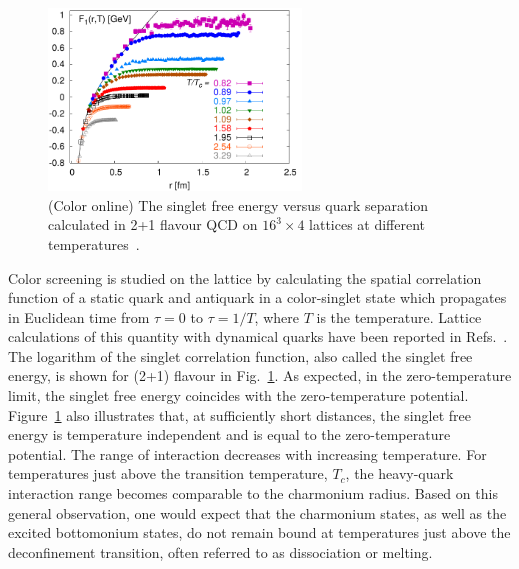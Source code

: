 \begin{figure}[h]
   \begin{center}
      \includegraphics[width=0.6\textwidth]{Figures/Fig15_LattSingEnergy.png}
      \caption{(Color online) The singlet free energy versus quark separation 
        calculated in 2+1 flavour QCD on $16^3 \times 4$ lattices at different 
             temperatures~\cite{Petreczky:2009ip,Petreczky:2010yn}.  
      }
      \label{Fig:LatticeSingEner}
   \end{center}
\end{figure}
Color screening is studied on the lattice by 
calculating the spatial correlation function of a static quark and
antiquark in a color-singlet state which propagates in Euclidean time 
from $\tau=0$ to $\tau=1/T$, where $T$ is the temperature.
Lattice calculations of this quantity with dynamical quarks have been
reported in Refs.~\cite{Petreczky:2009ip,Petreczky:2010yn,Kaczmarek:2002mc}.
The logarithm of the singlet
correlation function, also called the singlet free energy,
is shown for (2+1) flavour in Fig.~\ref{Fig:LatticeSingEner}. 
As expected, in the zero-temperature limit,
the singlet free energy coincides with the zero-temperature potential. 
Figure~\ref{Fig:LatticeSingEner} also illustrates that,
at sufficiently short distances, the singlet free energy is
temperature independent and is equal to the zero-temperature potential. 
The range of interaction decreases with increasing temperature.
For temperatures just above the transition temperature, $T_c$, the heavy-quark 
interaction range becomes comparable to the charmonium radius. Based on 
this general observation, one would expect that the charmonium
states, as well as the excited bottomonium states, do not remain bound at
temperatures just above the deconfinement transition, often referred to as 
dissociation or melting. 

